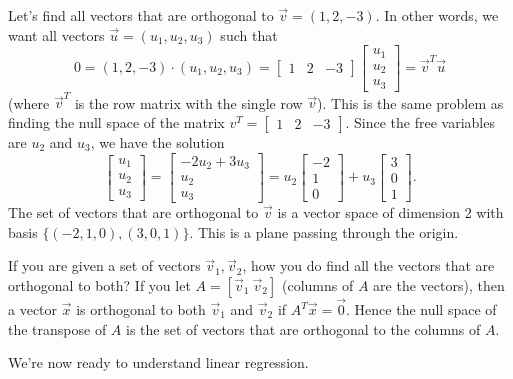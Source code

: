 \begin{example}
Let's find all vectors that are orthogonal to $\vec v = (1,2,-3)$.  In other words, we want all vectors $\vec u = (u_1,u_2,u_3)$ such that 
$$
0=(1,2,-3)\cdot(u_1,u_2,u_3) 
=
\begin{bmatrix}1&2&-3\end{bmatrix}
\begin{bmatrix}u_1\\u_2\\u_3\end{bmatrix}
=\vec v^T \vec u
$$
(where $\vec v^T$ is the row matrix with the single row $\vec v$).  This is the same problem as finding the null space of the matrix $v^T=\begin{bmatrix}1&2&-3\end{bmatrix}$. Since the free variables are $u_2$ and $u_3$, we have the solution 
$$
\begin{bmatrix}
u_1\\u_2\\u_3
\end{bmatrix}
=
\begin{bmatrix}
-2u_2+3u_3\\u_2\\u_3
\end{bmatrix}
=u_2
\begin{bmatrix}
-2\\1\\0
\end{bmatrix}
+u_3\begin{bmatrix}
3\\0\\1
\end{bmatrix}
.$$
The set of vectors that are orthogonal to $\vec v$ is a vector space of dimension 2 with basis $\{(-2,1,0),(3,0,1)\}$. This is a plane passing through the origin.
\end{example}

If you are given a set of vectors $\vec v_1,\vec v_2$, how you do find all the vectors that are orthogonal to both?  
If you let $A = [\vec v_1\ \vec v_2]$ (columns of $A$ are the vectors), then a vector $\vec x$ is orthogonal to both $\vec v_1$ and $\vec v_2$ if $A^T\vec x=\vec 0$.
Hence the null space of the transpose of $A$ is the set of vectors that are orthogonal to the columns of $A$.

We're now ready to understand linear regression.


